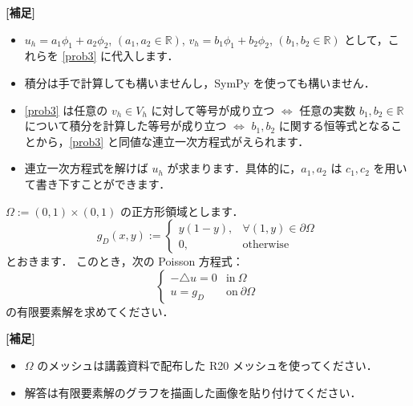 \documentclass{jarticle}
\newcommand{\prob}[1]{\fbox{\Large \,#1\,}}
\begin{document}
\textbf{[補足]}
\begin{itemize}
\item $u_h = a_1\phi_1 + a_2\phi_2$, $(a_1,a_2 \in \mathbb{R})$, $v_h = b_1\phi_1 + b_2\phi_2$, $(b_1,b_2 \in \mathbb{R})$ として，これらを \eqref{prob3} に代入します．
\item 積分は手で計算しても構いませんし，SymPy を使っても構いません．
\item \eqref{prob3} は任意の $v_h \in V_h$ に対して等号が成り立つ $\Longleftrightarrow$ 任意の実数 $b_1,b_2 \in \mathbb{R}$ について積分を計算した等号が成り立つ $\Longleftrightarrow$ $b_1,b_2$ に関する恒等式となることから，\eqref{prob3} と同値な連立一次方程式がえられます．
\item 連立一次方程式を解けば $u_h$ が求まります．具体的に，$a_1,a_2$ は $c_1,c_2$ を用いて書き下すことができます．
\end{itemize}
\prob{4} $\Omega := (0,1) \times (0,1)$ の正方形領域とします．
\[ g_D(x,y) := \begin{cases}
y(1-y), &\forall (1,y) \in \partial\Omega \\
0, &\textrm{otherwise}
\end{cases} \]
とおきます．
このとき，次の Poisson 方程式：
\[ \begin{cases}
-\triangle u = 0 &\textrm{in}~\Omega \\
u = g_D &\textrm{on}~\partial\Omega
\end{cases} \]
の有限要素解を求めてください．

\textbf{[補足]}
\begin{itemize}
\item $\Omega$ のメッシュは講義資料で配布した R20 メッシュを使ってください．
\item 解答は有限要素解のグラフを描画した画像を貼り付けてください．
\end{itemize}
\end{document}
